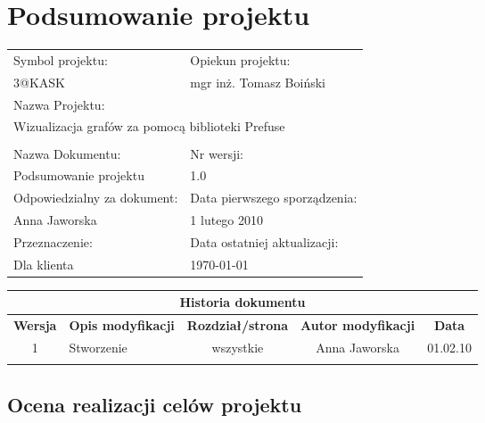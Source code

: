 
\section{Podsumowanie projektu}



\begin{center}
\begin{tabular}{|p{7cm}|p{7cm}|}
\hline
Symbol projektu: & Opiekun projektu:   \tabularnewline 
3@KASK & mgr inż. Tomasz Boiński    \tabularnewline \hline
\multicolumn{2}{|l|}{Nazwa Projektu: } \tabularnewline
\multicolumn{2}{|l|}{Wizualizacja grafów za pomocą biblioteki Prefuse } \tabularnewline 
\hline
\multicolumn{2}{l}{ } \tabularnewline %
\hline 
Nazwa Dokumentu: & Nr wersji:   \tabularnewline 
Podsumowanie projektu & 1.0 \tabularnewline \hline
Odpowiedzialny za dokument: & Data pierwszego sporządzenia:   \tabularnewline 
Anna Jaworska & 1 lutego 2010 \tabularnewline \hline
Przeznaczenie: & Data ostatniej aktualizacji:   \tabularnewline 
Dla klienta & \today \tabularnewline \hline
\end{tabular}
\end{center}

\begin{center}
\begin{tabular}{|c|p{4cm}|c|c|c|}
\multicolumn{5}{c}{\textbf{Historia dokumentu}} \tabularnewline \hline
\textbf{Wersja} & \textbf{Opis modyfikacji} & \textbf{Rozdział/strona} & \textbf{Autor modyfikacji} & \textbf{Data} \tabularnewline \hline 
1 & Stworzenie & wszystkie & Anna Jaworska & 01.02.10 \tabularnewline \hline
& & & &\tabularnewline \hline
\end{tabular}
 

\end{center}


\newpage




\subsection{Ocena realizacji celów projektu}
